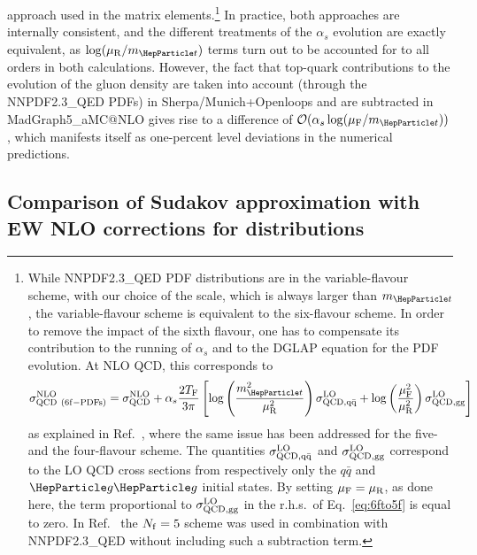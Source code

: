 \documentclass[11pt]{cernrep}
\begin{document}
approach used in the matrix elements.\footnote{While {\sc
    NNPDF2.3\_QED} PDF distributions are in the variable-flavour
  scheme, with our choice of the scale, which is always larger than
  $m_{\PQt}$, the variable-flavour scheme is equivalent to the
  six-flavour scheme.  In order to remove the impact of the sixth
  flavour, one has to compensate its contribution to the running of
  $\alpha_s$ and to the DGLAP equation for the PDF evolution. At NLO
  QCD, this corresponds to
$$
\sigma^{\rm NLO}_{\rm QCD~(6f-PDFs)} = \\ \sigma^{\rm NLO}_{\rm QCD} + \nonumber
\alpha_s \frac{2 T_{\rm F}}{3 \pi}\left[\log\left(\frac{m_{\PQt}^2}{\mu_{\rm R}^2}\right)
  \sigma^{\rm LO}_{\rm QCD,q\bar{q}}+ \log\left(\frac{\mu_{\rm F}^2}{\mu_{\rm R}^2}\right)
  \sigma^{\rm LO}_{\rm QCD,gg}\right]
\label{eq:6fto5f}
$$
as explained in Ref.~\cite{Cacciari:1998it}, where the same issue
has been addressed for the five- and the four-flavour scheme.  The
quantities $\sigma^{\rm LO}_{\rm QCD,q\bar{q}}$ and $ \sigma^{\rm
  LO}_{\rm QCD,gg}$ correspond to the LO QCD cross sections from
respectively only the $q\bar{q}$ and $\Pg\Pg$ initial states. By
setting $\mu_{\rm F}=\mu_{\rm R}$, as done here, the term proportional
to $ \sigma^{\rm LO}_{\rm QCD,gg}$ in the r.h.s.\ of
Eq.~\eqref{eq:6fto5f} is equal to zero. In
Ref.~\cite{Frixione:2015zaa} the $N_{\rm f}=5$ scheme was used in
combination with {\sc NNPDF2.3\_QED} without including such a
subtraction term.}  In practice, both approaches are internally
consistent, and the different treatments of the $\alpha_s$ evolution
are exactly equivalent, as $\log(\mu_{\rm R}/m_{\PQt})$ terms turn out
to be accounted for to all orders in both calculations. However, the
fact that top-quark contributions to the evolution of the gluon
density are taken into account (through the NNPDF2.3\_QED PDFs) in
{\sc Sherpa/Munich+Openloops} and are subtracted in {\sc
  MadGraph5\_aMC@NLO} gives rise to a difference of
$\mathcal{O}(\alpha_s\log(\mu_{\rm F}/m_{\PQt}))$, which manifests
itself as one-percent level deviations in the numerical predictions.



\subsection{Comparison of Sudakov approximation with EW NLO corrections for distributions}
\label{sec:sudakov;ew}
\end{document}
